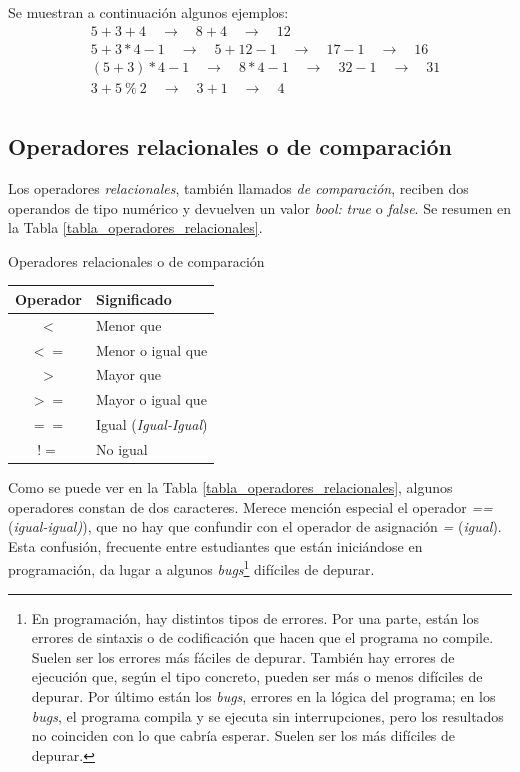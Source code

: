 Se muestran a continuación algunos ejemplos:
\begin{align*}
& 5 + 3 + 4 \quad \rightarrow \quad 8 + 4 \quad \rightarrow \quad 12\\
& 5 + 3 * 4 -1 \quad \rightarrow \quad 5 + 12 - 1 \quad \rightarrow \quad 17 - 1 \quad \rightarrow \quad 16\\
& (5 + 3) * 4 -1 \quad \rightarrow \quad 8 * 4 - 1 \quad \rightarrow \quad 32 - 1 \quad \rightarrow \quad 31\\
& 3 + 5 {\:} \% {\:}  2 \quad \rightarrow \quad 3 + 1 \quad \rightarrow \quad 4\\
\end{align*}

\subsection{Operadores relacionales o de comparación}
Los operadores \textit{relacionales}, también llamados \textit{de comparación}, reciben dos operandos de tipo numérico y devuelven un valor \textit{bool:} \textit{true} o \textit{false}. Se resumen en la Tabla \ref{tabla_operadores_relacionales}.

\begin{center}
   \begin{mytable}[label=tabla_operadores_relacionales]{\centering\footnotesize Operadores relacionales o de comparación}
      \footnotesize
      \begin{tabular}{c l}
         \hline
         \textbf{Operador} & \textbf{Significado} \\ \hline
         $<$ & Menor que \\
         $<=$ & Menor o igual que \\
         $>$ & Mayor que \\
         $>=$ & Mayor o igual que \\
         $==$ & Igual (\textit{Igual-Igual}) \\
         $!=$ & No igual \\
      \end{tabular}
   \end{mytable}
\end{center}

Como se puede ver en la Tabla \ref{tabla_operadores_relacionales}, algunos operadores constan de dos caracteres. Merece mención especial el operador \textit{==} (\textit{igual-igual)}), que no hay que confundir con el operador de asignación \textit{=} (\textit{igual}). Esta confusión, frecuente entre estudiantes que están iniciándose en programación, da lugar a algunos \textit{bugs}\footnote{En programación, hay distintos tipos de errores. Por una parte, están los errores de sintaxis o de codificación que hacen que el programa no compile. Suelen ser los errores más fáciles de depurar. También hay errores de ejecución que, según el tipo concreto, pueden ser más o menos difíciles de depurar. Por último están los \textit{bugs}, errores en la lógica del programa; en los \textit{bugs}, el programa compila y se ejecuta sin interrupciones, pero los resultados no coinciden con lo que cabría esperar. Suelen ser los más difíciles de depurar.} difíciles de depurar.

